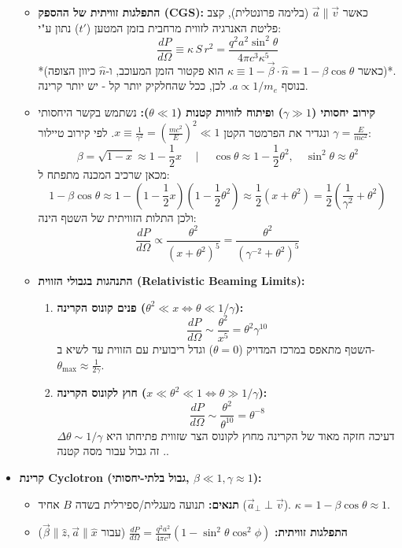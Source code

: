 \documentclass[10pt,a4paper]{article}
\begin{document}
\begin{multicols*}{2}
\begin{itemize}[leftmargin=*]
\begin{itemize}
        \item \textbf{התפלגות זוויתית של ההספק \textenglish{(CGS)}:}
        כאשר $\vec{a} \parallel \vec{v}$ (בלימה פרונטלית), קצב פליטת האנרגיה לזווית מרחבית בזמן המטען ($t'$) נתון ע"י:
        $$\frac{dP}{d\Omega} \equiv \kappa \, S \, r^2 = \frac{q^2 a^2 \sin^2\theta}{4\pi c^3 \kappa^5}$$
        *(כאשר $\kappa \equiv 1 - \vec{\beta} \cdot \hat{n} = 1 - \beta\cos\theta$ הוא פקטור הזמן המעוכב, ו-$\hat{n}$ כיוון הצופה)*. בנוסף $a \propto 1/m_e$. לכן, ככל שהחלקיק יותר קל - יש יותר קרינה.

        
        \item \textbf{קירוב יחסותי ($\gamma \gg 1$) ופיתוח לזוויות קטנות ($\theta \ll 1$):}
        נשתמש בקשר היחסותי $\gamma = \frac{E}{m c^2}$ ונגדיר את הפרמטר הקטן $x \equiv \frac{1}{\gamma^2} = \left(\frac{m c^2}{E}\right)^2 \ll 1$.
        לפי קירוב טיילור:
        $$\beta = \sqrt{1 - x} \approx 1 - \frac{1}{2}x \quad \mid \quad \cos\theta \approx 1 - \frac{1}{2}\theta^2, \quad \sin^2\theta \approx \theta^2$$
        מכאן שרכיב המכנה מתפתח ל:
        $$1 - \beta\cos\theta \approx 1 - (1 - \frac{1}{2}x)\left(1 - \frac{1}{2}\theta^2\right) \approx \frac{1}{2}\left(x + \theta^2\right) = \frac{1}{2}\left(\frac{1}{\gamma^2} + \theta^2\right)$$
        ולכן התלות הזוויתית של השטף הינה:
        $$\frac{dP}{d\Omega} \propto \frac{\theta^2}{\left(x + \theta^2\right)^5} = \frac{\theta^2}{\left(\gamma^{-2} + \theta^2\right)^5}$$

        \item \textbf{התנהגות בגבולי הזווית \textenglish{(Relativistic Beaming Limits)}:}
        \begin{enumerate}
            \item \textbf{פנים קונוס הקרינה ($\theta^2 \ll x \iff \theta \ll 1/\gamma$):}
            $$\frac{dP}{d\Omega} \sim \frac{\theta^2}{x^5} = \theta^2 \gamma^{10}$$
            השטף מתאפס במרכז המדויק ($\theta=0$) וגדל ריבועית עם הזווית עד לשיא ב-$\theta_{\max} \approx \frac{1}{2\gamma}$.
            
            \item \textbf{חוץ לקונוס הקרינה ($x \ll \theta^2 \ll 1 \iff \theta \gg 1/\gamma$):}
            $$\frac{dP}{d\Omega} \sim \frac{\theta^2}{\theta^{10}} = \theta^{-8}$$
            דעיכה חזקה מאוד של הקרינה מחוץ לקונוס הצר שזווית פתיחתו היא $\Delta\theta \sim 1/\gamma$. זה גבול עבור מסה קטנה.
        \end{enumerate}
    \end{itemize}

\item \textbf{קרינת Cyclotron (גבול בלתי-יחסותי, $\beta \ll 1, \gamma \approx 1$):}
\begin{itemize}
    \item \textbf{תנאים:} תנועה מעגלית/ספירלית בשדה $B$ אחיד ($\vec{a}_\perp \perp \vec{v}$). $\kappa = 1-\beta\cos\theta \approx 1$.
    \item \textbf{התפלגות זוויתית:} $\frac{dP}{d\Omega} = \frac{q^2 a^2}{4\pi c^3} (1 - \sin^2\theta\cos^2\phi)$ \quad (עבור $\vec{\beta} \parallel \hat{z}, \vec{a} \parallel \hat{x}$)


\end{itemize}
\end{itemize}
\end{multicols*}
\end{document}
